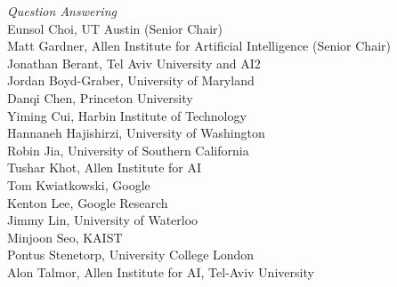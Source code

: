 \emph{Question Answering} \\
\hspace*{0.2in} Eunsol Choi, UT Austin (Senior Chair)\\
\hspace*{0.2in} Matt Gardner, Allen Institute for Artificial Intelligence (Senior Chair)\\
\hspace*{0.2in} Jonathan Berant, Tel Aviv University and AI2\\
\hspace*{0.2in} Jordan Boyd-Graber, University of Maryland\\
\hspace*{0.2in} Danqi Chen, Princeton University\\
\hspace*{0.2in} Yiming Cui, Harbin Institute of Technology\\
\hspace*{0.2in} Hannaneh Hajishirzi, University of Washington\\
\hspace*{0.2in} Robin Jia, University of Southern California\\
\hspace*{0.2in} Tushar Khot, Allen Institute for AI\\
\hspace*{0.2in} Tom Kwiatkowski, Google\\
\hspace*{0.2in} Kenton Lee, Google Research\\
\hspace*{0.2in} Jimmy Lin, University of Waterloo\\
\hspace*{0.2in} Minjoon Seo, KAIST\\
\hspace*{0.2in} Pontus Stenetorp, University College London\\
\hspace*{0.2in} Alon Talmor, Allen Institute for AI, Tel-Aviv University\\

